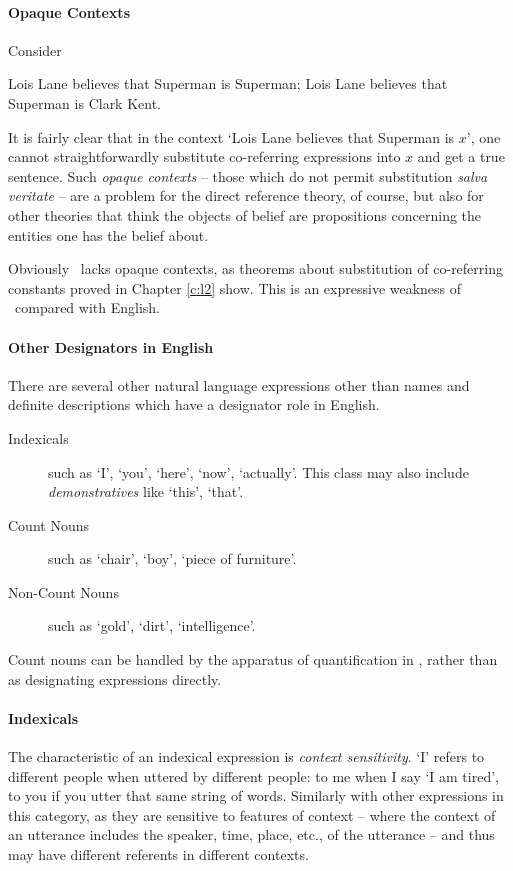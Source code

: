 \paragraph{Opaque Contexts}
 Consider \begin{exe}
	\ex Lois Lane believes that Superman is Superman;
	\ex Lois Lane believes that Superman is Clark Kent.
\end{exe}
It is fairly clear that in the context `Lois Lane believes that Superman is $x$', one cannot straightforwardly substitute co-referring expressions into $x$ and get a true sentence. Such \emph{opaque contexts} – those which do not permit substitution \emph{salva veritate} – are a problem for the direct reference theory, of course, but also for other theories that think the objects of belief are propositions concerning the entities one has the belief about. 

Obviously \ltwo\ lacks opaque contexts, as theorems about substitution of co-referring constants proved in Chapter \ref{c:l2} show. This is an expressive weakness of \ltwo\ compared with English.



\paragraph{Other Designators in English}
There are several other natural language expressions other than names and definite descriptions which have a designator role in English. \begin{description}
	\item [Indexicals] such as `I', `you', `here', `now', `actually'. This class may also include \emph{demonstratives} like `this', `that'.
	\item [Count Nouns] such as `chair', `boy', `piece of furniture'.
	\item [Non-Count Nouns] such as `gold', `dirt', `intelligence'.
\end{description}
Count nouns can be handled by the apparatus of quantification in \ltwo, rather than as designating expressions directly. 

\paragraph{Indexicals}
The characteristic of an indexical expression is \emph{context sensitivity}. `I' refers to different people when uttered by different people: to me when I say `I am tired', to you if you utter that same string of words. Similarly with other expressions in this category, as they are sensitive to features of context – where the context of an utterance includes the speaker, time, place, etc., of the utterance – and thus may have different referents in different contexts.

